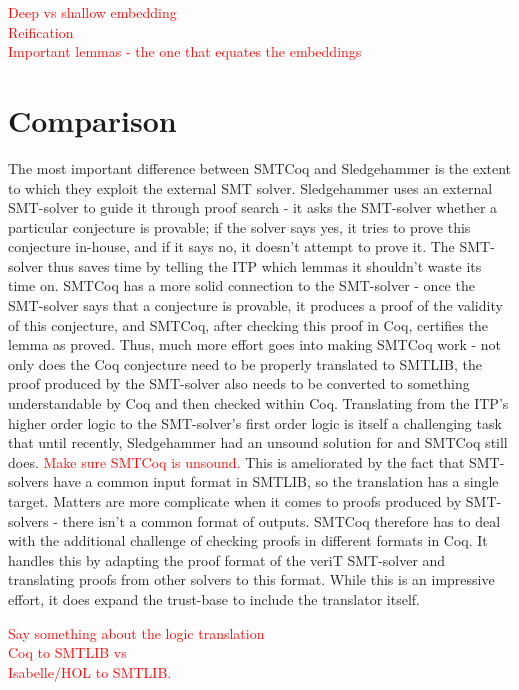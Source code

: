 \documentclass{article}
\begin{document}
	\textcolor{red}{Deep vs shallow embedding}\\
	\textcolor{red}{Reification}\\
	\textcolor{red}{Important lemmas - the one that equates the embeddings}\\
	
\section{Comparison}
\label{sec:comp}
	The most important difference between SMTCoq and Sledgehammer
	is the extent to which they exploit the external SMT solver. 
	Sledgehammer uses an external SMT-solver to guide it through 
	proof search - it asks the SMT-solver whether a particular 
	conjecture is provable; if the solver says yes, 
	it tries to prove this conjecture in-house, and if it says 
	no, it doesn't attempt to prove it. The SMT-solver thus 
	saves time by telling the ITP which lemmas it shouldn't
	waste its time on. SMTCoq has a more solid connection to 
	the SMT-solver - once the SMT-solver says that a conjecture is 
	provable, it produces a proof of the validity of this 
	conjecture, and SMTCoq, after checking this proof in 
	Coq, certifies the lemma as proved. Thus,
	much more effort goes into making SMTCoq work - not only 
	does the Coq conjecture need to be properly translated to 
	SMTLIB, the proof produced by the SMT-solver also 
	needs to be converted to something understandable 
	by Coq and then checked within Coq. Translating from the ITP's 
	higher order logic to the SMT-solver's first order logic 
	is itself a challenging task that until recently, Sledgehammer 
	had an unsound solution for and SMTCoq still does. 
	\textcolor{red}{Make sure SMTCoq is unsound.} 
	This is ameliorated by the fact that
	SMT-solvers have a common input format in SMTLIB, so the 
	translation has a single target. Matters are more complicate 
	when it comes to proofs produced by SMT-solvers - there isn't 
	a common format of outputs. SMTCoq therefore has to deal with 
	the additional challenge of checking proofs in different 
	formats in Coq. It handles this by adapting the proof 
	format of the veriT SMT-solver and translating proofs 
	from other solvers to this format. While this is an impressive
	effort, it does expand the trust-base to include the 
	translator itself.
	
	\textcolor{red}{Say something about the logic translation \\
		Coq to SMTLIB vs \\
		Isabelle/HOL to SMTLIB.}
	
\end{document}
